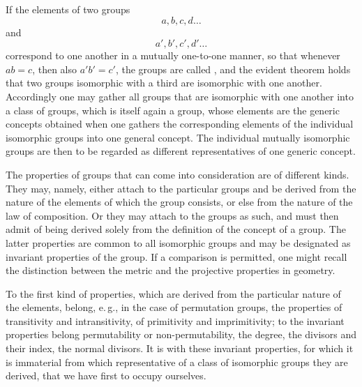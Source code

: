 

If the elements of two groups
\[
a, b, c, d \ldots
\]
and
\[
a', b', c', d' \ldots
\]
correspond to one another in a mutually one-to-one manner, so that whenever $ab = c$, then also $a'b' = c'$, the groups are called , and the evident theorem holds that two groups isomorphic with a third are isomorphic with one another. Accordingly one may gather all groups that are isomorphic with one another into a class of groups, which is itself again a group, whose elements are the generic concepts obtained when one gathers the corresponding elements of the individual isomorphic groups into one general concept. The individual mutually isomorphic groups are then to be regarded as different representatives of one generic concept.

The properties of groups that can come into consideration are of different kinds. They may, namely, either attach to the particular groups and be derived from the nature of the elements of which the group consists, or else from the nature of the law of composition. Or they may attach to the groups as such, and must then admit of being derived solely from the definition of the concept of a group. The latter properties are common to all isomorphic groups and may be designated as invariant properties of the group. If a comparison is permitted, one might recall the distinction between the metric and the projective properties in geometry.

To the first kind of properties, which are derived from the particular nature of the elements, belong, e.\,g., in the case of permutation groups, the properties of transitivity and intransitivity, of primitivity and imprimitivity; to the invariant properties belong permutability or non-permutability, the degree, the divisors and their index, the normal divisors. It is with these invariant properties, for which it is immaterial from which representative of a class of isomorphic groups they are derived, that we have first to occupy ourselves.
